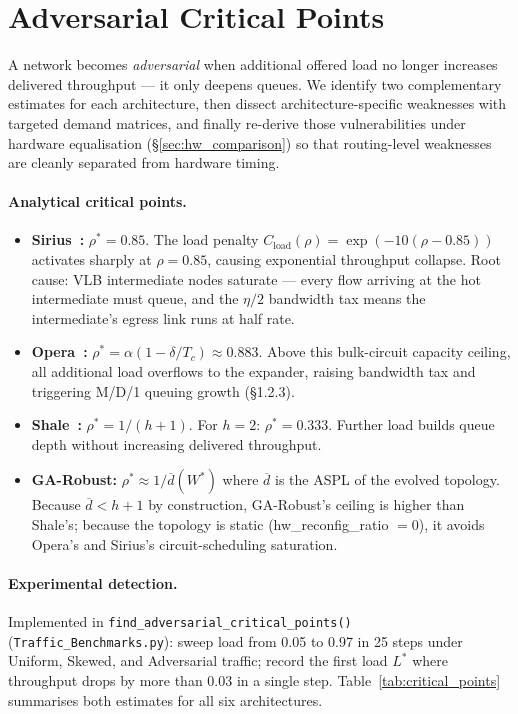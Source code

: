 \documentclass{article}
\begin{document}
    \section{Adversarial Critical Points}
    \label{sec:critical_points}

    A network becomes \emph{adversarial} when additional offered load no longer increases delivered throughput --- it only deepens queues.  We identify two complementary estimates for each architecture, then dissect architecture-specific weaknesses with targeted demand matrices, and finally re-derive those vulnerabilities under hardware equalisation (\S\ref{sec:hw_comparison}) so that routing-level weaknesses are cleanly separated from hardware timing.

    \paragraph{Analytical critical points.}
    \begin{itemize}
        \item \textbf{Sirius~\cite{sirius}:} $\rho^* = 0.85$.  The load penalty $C_{\text{load}}(\rho) = \exp(-10(\rho-0.85))$ activates sharply at $\rho=0.85$, causing exponential throughput collapse.  Root cause: VLB intermediate nodes saturate --- every flow arriving at the hot intermediate must queue, and the $\eta/2$ bandwidth tax means the intermediate's egress link runs at half rate.
        \item \textbf{Opera~\cite{opera}:} $\rho^* = \alpha(1-\delta/T_c) \approx 0.883$.  Above this bulk-circuit capacity ceiling, all additional load overflows to the expander, raising bandwidth tax and triggering M/D/1 queuing growth (\S1.2.3).
        \item \textbf{Shale~\cite{shale}:} $\rho^* = 1/(h{+}1)$.  For $h=2$: $\rho^*=0.333$.  Further load builds queue depth without increasing delivered throughput.
        \item \textbf{GA-Robust:} $\rho^* \approx 1/\overline{d}(W^*)$ where $\overline{d}$ is the ASPL of the evolved topology.  Because $\overline{d} < h{+}1$ by construction, GA-Robust's ceiling is higher than Shale's; because the topology is static (hw\_reconfig\_ratio $= 0$), it avoids Opera's and Sirius's circuit-scheduling saturation.
    \end{itemize}

    \paragraph{Experimental detection.}
    Implemented in \texttt{find\_adversarial\_critical\_points()} (\texttt{Traffic\_Benchmarks.py}): sweep load from 0.05 to 0.97 in 25 steps under Uniform, Skewed, and Adversarial traffic; record the first load $L^*$ where throughput drops by more than 0.03 in a single step.  Table~\ref{tab:critical_points} summarises both estimates for all six architectures.
\end{document}
